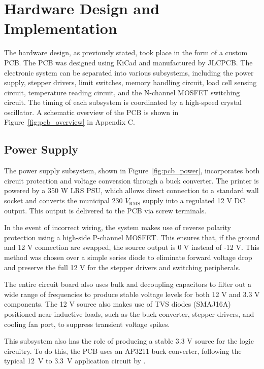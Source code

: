 \section{Hardware Design and Implementation}
The hardware design, as previously stated, took place in the form of a custom PCB. The PCB was designed using KiCad and manufactured by JLCPCB. The electronic system can be separated into various subsystems, including the power supply, stepper drivers, limit switches, memory handling circuit, load cell sensing circuit, temperature reading circuit, and the N-channel MOSFET switching circuit. The timing of each subsystem is coordinated by a high-speed crystal oscillator. A schematic overview of the PCB is shown in Figure~\ref{fig:pcb_overview} in Appendix C.


\subsection{Power Supply}
The power supply subsystem, shown in Figure~\ref{fig:pcb_power}, incorporates both circuit protection and voltage conversion through a buck converter. The printer is powered by a 350 W LRS PSU, which allows direct connection to a standard wall socket and converts the municipal 230 $V_{\text{RMS}}$ supply into a regulated 12 V DC output. This output is delivered to the PCB via screw terminals. 

In the event of incorrect wiring, the system makes use of reverse polarity protection using a high-side P-channel MOSFET. This ensures that, if the ground and 12 V connection are swapped, the source output is 0 V instead of -12 V. This method was chosen over a simple series diode to eliminate forward voltage drop and preserve the full 12 V for the stepper drivers and switching peripherals. 

The entire circuit board also uses bulk and decoupling capacitors to filter out a wide range of frequencies to produce stable voltage levels for both 12 V and 3.3 V components. The 12 V source also makes use of TVS diodes (SMAJ16A) positioned near inductive loads, such as the buck converter, stepper drivers, and cooling fan port, to suppress transient voltage spikes.

This subsystem also has the role of producing a stable 3.3 V source for the logic circuitry. To do this, the PCB uses an AP3211 buck converter, following the typical \SI{12}{V} to \SI{3.3}{V} application circuit by \cite{AP3211}.
